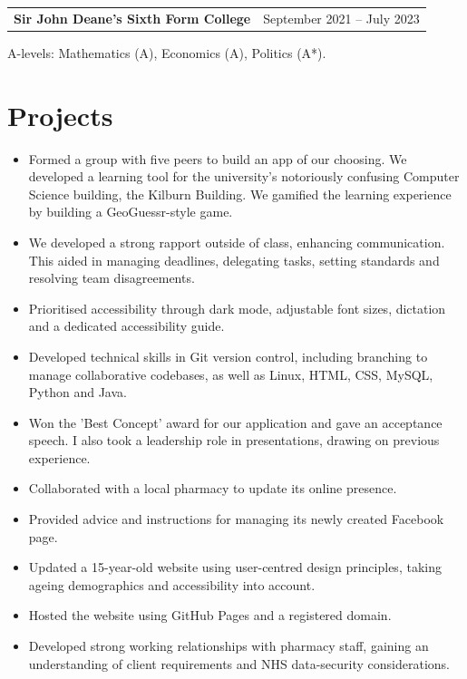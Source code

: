 \documentclass[11pt,a4paper]{article}
\makeatletter
\newcommand{\datedheading}[2]{%
 \noindent\begin{tabularx}{\linewidth}{@{}>{\raggedright\arraybackslash}X>{\raggedleft\arraybackslash}r@{}}
 \textbf{#1} & {\small\color{muted}#2}
 \end{tabularx}\par
}
\newcommand{\projectheading}[1]{\needspace{5\baselineskip}\vspace{3pt}{\bfseries #1}\par\vspace{-1pt}}
\makeatother
\begin{document}
\datedheading{Sir John Deane's Sixth Form College}{September 2021 -- July 2023}
A-levels: Mathematics (A), Economics (A), Politics (A*).

\section*{Projects}
\projectheading{Accessibility Learning Platform: Kilburn Klues -- University of Manchester}
\begin{itemize}
 \item Formed a group with five peers to build an app of our choosing. We developed a learning tool for the university's notoriously confusing Computer Science building, the Kilburn Building. We gamified the learning experience by building a GeoGuessr-style game.
 \item We developed a strong rapport outside of class, enhancing communication. This aided in managing deadlines, delegating tasks, setting standards and resolving team disagreements.
 \item Prioritised accessibility through dark mode, adjustable font sizes, dictation and a dedicated accessibility guide.
 \item Developed technical skills in Git version control, including branching to manage collaborative codebases, as well as Linux, HTML, CSS, MySQL, Python and Java.
 \item Won the 'Best Concept' award for our application and gave an acceptance speech. I also took a leadership role in presentations, drawing on previous experience.
\end{itemize}

\projectheading{Updating the Online Presence of a Local Business -- Moston Pharmacy}
\begin{itemize}
 \item Collaborated with a local pharmacy to update its online presence.
 \item Provided advice and instructions for managing its newly created Facebook page.
 \item Updated a 15-year-old website using user-centred design principles, taking ageing demographics and accessibility into account.
 \item Hosted the website using GitHub Pages and a registered domain.
 \item Developed strong working relationships with pharmacy staff, gaining an understanding of client requirements and NHS data-security considerations.
\end{itemize}
\end{document}
